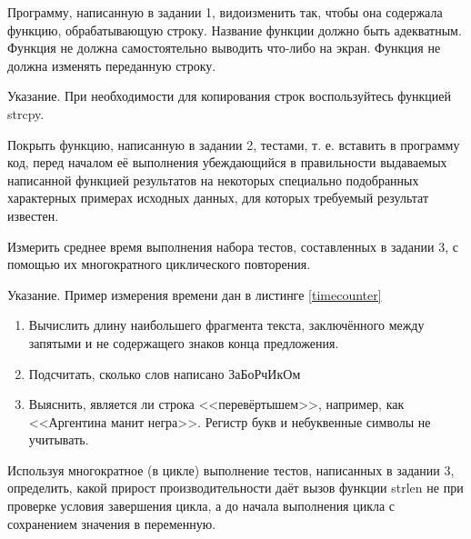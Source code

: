 \labtask

Программу, написанную в задании 1, видоизменить так, чтобы она содержала функцию, обрабатывающую строку.
Название функции должно быть адекватным.
Функция не должна самостоятельно выводить что-либо на экран.
Функция не должна изменять переданную строку.

Указание. При необходимости для копирования строк воспользуйтесь функцией strcpy.

\labtask

Покрыть функцию, написанную в задании 2, тестами,
т. е. вставить в программу код, перед началом её выполнения убеждающийся в правильности выдаваемых написанной функцией результатов
на некоторых специально подобранных характерных примерах исходных данных,
для которых требуемый результат известен.

\labtask

Измерить среднее время выполнения набора тестов, составленных в задании 3, с помощью их многократного циклического повторения.

Указание. Пример измерения времени дан в листинге \ref{timecounter}


\reservedtasks

\begin{enumerate}
	\item
		Вычислить длину наибольшего фрагмента текста, заключённого между запятыми и не содержащего знаков конца предложения.
	\item
		Подсчитать, сколько слов написано ЗаБоРчИкОм
	\item
		Выяснить, является ли строка <<перевёртышем>>, например, как <<Аргентина манит негра>>.
		Регистр букв и небуквенные символы не учитывать.
\end{enumerate}


\labtask

Используя многократное (в цикле) выполнение тестов, написанных в задании 3, определить, какой прирост производительности даёт вызов функции strlen не при проверке условия завершения цикла, а до начала выполнения цикла с сохранением значения в переменную.



